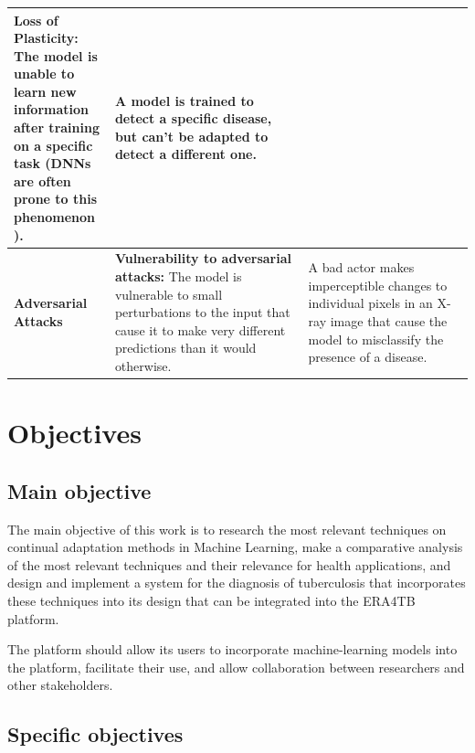 \documentclass[../main.tex]{subfiles}
\begin{document}
\begin{table}[H]
{\begin{tabular}{p{0.22\linewidth} | p{0.42\linewidth} | p{0.41\linewidth}}
            \textbf{Loss of Plasticity:} The model is unable to learn new information after training on a specific task (DNNs are often prone to this phenomenon \cite{parisi_continual_2019}).
            & \footnotesize
            A model is trained to detect a specific disease, but can't be adapted to detect a different one. \\
        \midrule
            \small \textbf{Adversarial Attacks} & \footnotesize
            \textbf{Vulnerability to adversarial attacks:}  The model is vulnerable to small perturbations to the input that cause it to make very different predictions than it would otherwise.
            & \footnotesize
            A bad actor makes imperceptible changes to individual pixels in an X-ray image that cause the model to misclassify the presence of a disease. \\
        \bottomrule
        \end{tabular}
    }
    \end{table}
    
    \vspace*{-0.9cm}

    \section{Objectives} \label{sec:objectives}

    \subsection*{Main objective} \label{sec:main_goal}

    The main objective of this work is to research the most relevant techniques on continual adaptation methods in Machine Learning, make a comparative analysis of the most relevant techniques and their relevance for health applications, and design and implement a system for the diagnosis of tuberculosis that incorporates these techniques into its design that can be integrated into the ERA4TB platform. 
    
    The platform should allow its users to incorporate machine-learning models into the platform, facilitate their use, and allow collaboration between researchers and other stakeholders.

    \subsection*{Specific objectives} \label{sec:specific_objectives}
\end{document}
